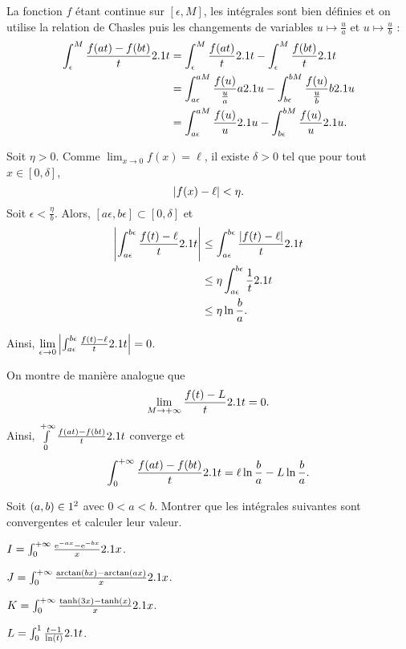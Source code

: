\begin{solution}
\begin{reponses}
\item La fonction $f$ étant continue sur $[\epsilon, M]$, les intégrales sont bien définies et on utilise la relation de Chasles puis les changements de variables $u \mapsto \frac{u}{a}$ et $u \mapsto \frac{u}{b}$ :
\begin{align*}
\int_\epsilon^M \frac{f(a t) - f(b t)}{t} 2.1 t
&= \int_\epsilon^M \frac{f(a t)}{t} 2.1 t - \int_\epsilon^M \frac{f(b t)}{t} 2.1 t\\
&= \int_{a\epsilon}^{a M} \frac{f(u)}{\frac{u}{a}} a 2.1 u - \int_{b\epsilon}^{b M} \frac{f(u)}{\frac{u}{b}} b 2.1 u\\
&= \int_{a\epsilon}^{a M} \frac{f(u)}{u} 2.1 u - \int_{b\epsilon}^{b M} \frac{f(u)}{u} 2.1 u.
\end{align*}

\item Soit $\eta > 0$. Comme $\lim_{x \to 0} f(x) = \ell$, il existe $\delta > 0$ tel que pour tout $x \in [0, \delta]$,
\[
\left| f(x) - \ell \right| < \eta.
\]
Soit $\epsilon < \frac{\eta}{b}$. Alors, $[a\epsilon, b\epsilon] \subset [0, \delta]$ et
\begin{align*}
\left| \int_{a\epsilon}^{b\epsilon} \frac{f(t) - \ell}{t} 2.1 t \right|
&\leq \int_{a\epsilon}^{b\epsilon} \frac{\left| f(t) - \ell \right|}{t} 2.1 t\\
&\leq \eta \int_{a\epsilon}^{b\epsilon} \frac{1}{t} 2.1 t\\
&\leq \eta \ln\frac{b}{a}.
\end{align*}

Ainsi, $\lim\limits_{\epsilon\to0} \left| \int_{a\epsilon}^{b\epsilon} \frac{f(t) - \ell}{t} 2.1 t \right| = 0$.

\item On montre de manière analogue que
\[
\lim_{M\to+\infty} \frac{f(t) - L}{t} 2.1 t = 0.
\]
Ainsi, $\int\limits_0^{+\infty} \frac{f(a t) - f(b t)}{t} 2.1 t$ converge et
\[
\int_0^{+\infty} \frac{f(a t) - f(b t)}{t} 2.1 t
= \ell \ln\frac{b}{a} - L \ln\frac{b}{a}.
\]
\end{reponses}
\end{solution}

\begin{exercice}
Soit $(a, b) \in 1^2$ avec $0<a<b$. Montrer que les intégrales suivantes sont convergentes et calculer leur valeur.
\begin{questions}
\item $I = \int_0^{+\infty} \frac{\mathrm{e}^{-ax} - \mathrm{e}^{-bx}}{x} 2.1 x$.
\item $J = \int_0^{+\infty} \frac{\arctan(bx) - \arctan(ax)}{x} 2.1 x$.
\item $K = \int_0^{+\infty} \frac{\tanh(3x) - \tanh(x)}{x} 2.1 x$.
\item $L = \int_0^1 \frac{t - 1}{\ln(t)} 2.1 t$.
\end{questions}
\end{exercice}

